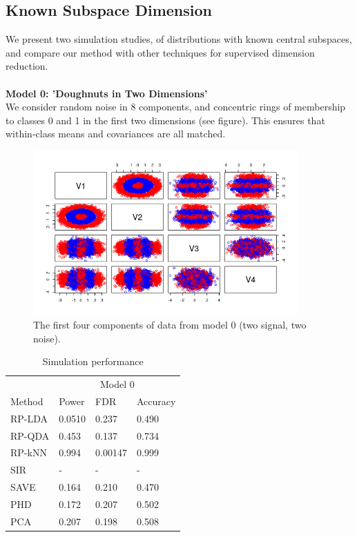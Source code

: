 \documentclass[12pt]{article}
\begin{document}
\subsection{Known Subspace Dimension}

We present two simulation studies, of distributions with known central subspaces, and compare our method with other techniques for supervised dimension reduction. \\
~\\
\textbf{Model 0: 'Doughnuts in Two Dimensions'} \\
We consider random noise in 8 components, and concentric rings of membership to classes 0 and 1 in the first two dimensions (see figure). This ensures that within-class means and covariances are all matched. \\

\begin{figure}[htbp]
    \centering
    \includegraphics[width=4in]{../results/figures/doughnuts.png}
    \caption{The first four components of data from model 0 (two signal, two noise).\label{fig:doughnuts}}
\end{figure}

\begin{table}
  \caption{Simulation performance}
  \label{sample-table}
  \centering
  \begin{tabular}{l|lll}
    \toprule
    & \multicolumn{3}{c}{Model 0}                  \\
    \cmidrule(r){1-4}
    Method     & Power     & FDR & Accuracy  \\
   
    \cmidrule(r){1-4}
    RP-LDA & 0.0510 & 0.237  &   0.490\\
    RP-QDA & 0.453 & 0.137 &  0.734 \\
    RP-kNN & 0.994  & 0.00147 & 0.999\\
    SIR & - &  - &  -  \\
    SAVE & 0.164 & 0.210 & 0.470 \\
    PHD & 0.172 & 0.207 &     0.502 \\
    PCA & 0.207 & 0.198 & 0.508 \\
    \bottomrule
  \end{tabular}
\end{table}
\end{document}

